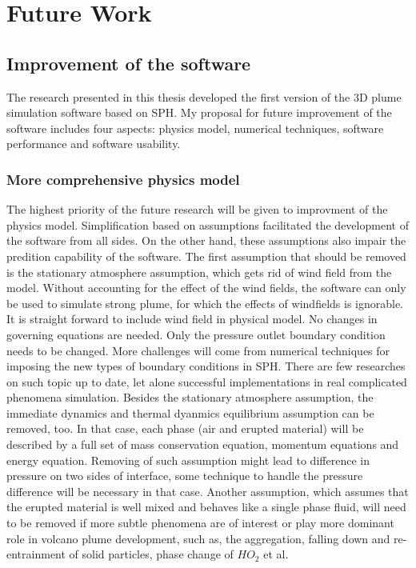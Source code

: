 \chapter{Future Work} \label{chapter:Future-Work}
\section{Improvement of the software}
The research presented in this thesis developed the first version of the 3D plume simulation software based on SPH.
My proposal for future improvement of the software includes four aspects: physics model, numerical techniques, software performance and software usability.

\subsection{More comprehensive physics model}
The highest priority of the future research will be given to improvment of the physics model. Simplification based on assumptions facilitated the development of the software from all sides. On the other hand, these assumptions also impair the predition capability of the software. The first assumption that should be removed is the stationary atmosphere assumption, which gets rid of wind field from the model. Without accounting for the effect of the wind fields, the software can only be used to simulate strong plume, for which the effects of windfields is ignorable. It is straight forward to include wind field in physical model. No changes in governing equations are needed. Only the pressure outlet boundary condition needs to be changed. More challenges will come from numerical techniques for imposing the new types of boundary conditions in SPH. There are few researches on such topic up to date, let alone successful implementations in real complicated phenomena simulation. Besides the stationary atmosphere assumption, the immediate dynamics and thermal dyanmics equilibrium assumption can be removed, too. In that case, each phase (air and erupted material) will be described by a full set of mass conservation equation, momentum equations and energy equation. Removing of such assumption might lead to difference in pressure on two sides of interface, some technique to handle the pressure difference will be necessary in that case. Another assumption, which assumes that the erupted material is well mixed and behaves like a single phase fluid, will need to be removed if more subtle phenomena are of interest or play more dominant role in volcano plume development, such as, the aggregation, falling down and re-entrainment of solid particles, phase change of $HO_2$ et al. 

